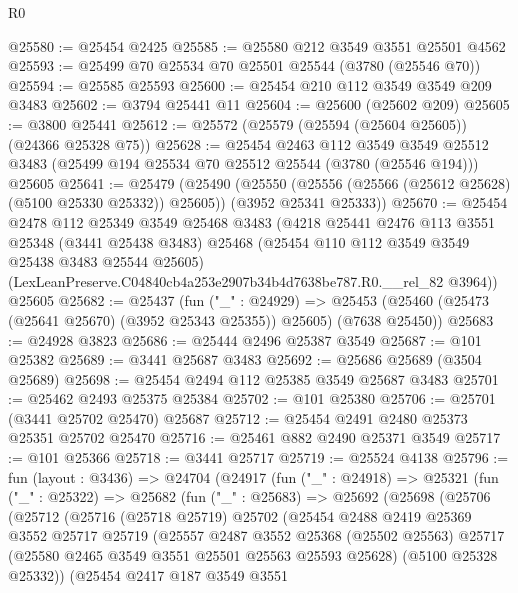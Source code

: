 \begin{lexlean}{R0}
\begin{coremodule}
@25580 := @25454 @2425
@25585 := @25580 @212 @3549 @3551 @25501 @4562
@25593 := @25499 @70 @25534 @70 @25501 @25544 (@3780 (@25546 @70))
@25594 := @25585 @25593
@25600 := @25454 @210 @112 @3549 @3549 @209 @3483
@25602 := @3794 @25441 @11
@25604 := @25600 (@25602 @209)
@25605 := @3800 @25441
@25612 := @25572 (@25579 (@25594 (@25604 @25605)) (@24366 @25328 @75))
@25628 := @25454
    @2463
    @112
    @3549
    @3549
    @25512
    @3483
    (@25499 @194 @25534 @70 @25512 @25544 (@3780 (@25546 @194)))
    @25605
@25641 := @25479
    (@25490
      (@25550 (@25556 (@25566 (@25612 @25628) (@5100 @25330 @25332)) @25605))
      (@3952 @25341 @25333))
@25670 := @25454
    @2478
    @112
    @25349
    @3549
    @25468
    @3483
    (@4218
      @25441
      @2476
      @113
      @3551
      @25348
      (@3441 @25438 @3483)
      @25468
      (@25454 @110 @112 @3549 @3549 @25438 @3483 @25544 @25605)
      (LexLeanPreserve.C04840cb4a253e2907b34b4d7638be787.R0.__rel_82 @3964))
    @25605
@25682 := @25437
    (fun ("_" : @24929) =>
    @25453 (@25460 (@25473 (@25641 @25670) (@3952 @25343 @25355)) @25605) (@7638 @25450))
@25683 := @24928 @3823
@25686 := @25444 @2496 @25387 @3549
@25687 := @101 @25382
@25689 := @3441 @25687 @3483
@25692 := @25686 @25689 (@3504 @25689)
@25698 := @25454 @2494 @112 @25385 @3549 @25687 @3483
@25701 := @25462 @2493 @25375 @25384
@25702 := @101 @25380
@25706 := @25701 (@3441 @25702 @25470) @25687
@25712 := @25454 @2491 @2480 @25373 @25351 @25702 @25470
@25716 := @25461 @882 @2490 @25371 @3549
@25717 := @101 @25366
@25718 := @3441 @25717
@25719 := @25524 @4138
@25796 := fun (layout : @3436) =>
  @24704
    (@24917
      (fun ("_" : @24918) =>
      @25321
        (fun ("_" : @25322) =>
        @25682
          (fun ("_" : @25683) =>
          @25692
            (@25698
              (@25706
                (@25712
                  (@25716
                    (@25718 @25719)
                    @25702
                    (@25454
                      @2488
                      @2419
                      @25369
                      @3552
                      @25717
                      @25719
                      (@25557
                        @2487
                        @3552
                        @25368
                        (@25502 @25563)
                        @25717
                        (@25580 @2465 @3549 @3551 @25501 @25563 @25593 @25628)
                        (@5100 @25328 @25332))
                      (@25454
                        @2417
                        @187
                        @3549
                        @3551

\end{coremodule}
\end{lexlean}
